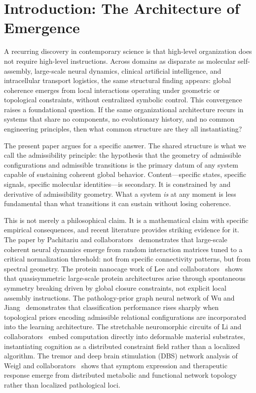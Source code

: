 \documentclass[11pt, oneside]{article}
\numberwithin{equation}{section}
\theoremstyle{rsvpstyle}
\theoremstyle{remark}
\begin{document}
\newpage

\tableofcontents

\section{Introduction: The Architecture of Emergence}

A recurring discovery in contemporary science is that high-level organization does not
require high-level instructions. Across domains as disparate as molecular self-assembly,
large-scale neural dynamics, clinical artificial intelligence, and intracellular transport
logistics, the same structural finding appears: global coherence emerges from local
interactions operating under geometric or topological constraints, without centralized
symbolic control. This convergence raises a foundational question. If the same
organizational architecture recurs in systems that share no components, no evolutionary
history, and no common engineering principles, then what common structure are they all
instantiating?

The present paper argues for a specific answer. The shared structure is what we call the
admissibility principle: the hypothesis that the geometry of admissible configurations and
admissible transitions is the primary datum of any system capable of sustaining coherent
global behavior. Content---specific states, specific signals, specific molecular
identities---is secondary. It is constrained by and derivative of admissibility geometry.
What a system \emph{is} at any moment is less fundamental than what transitions it can
sustain without losing coherence.

This is not merely a philosophical claim. It is a mathematical claim with specific
empirical consequences, and recent literature provides striking evidence for it. The
paper by Pachitariu and collaborators~\cite{Pachitariu2026Critical} demonstrates that
large-scale coherent neural dynamics emerge from random interaction matrices tuned to
a critical normalization threshold: not from specific connectivity patterns, but from
spectral geometry. The protein nanocage work of Lee and collaborators~\cite{Lee2026Nanocages}
shows that quasisymmetric large-scale protein architectures arise through spontaneous
symmetry breaking driven by global closure constraints, not explicit local assembly
instructions. The pathology-prior graph neural network of Wu and Jiang~\cite{Wu2026GNN}
demonstrates that classification performance rises sharply when topological priors encoding
admissible relational configurations are incorporated into the learning architecture.
The stretchable neuromorphic circuits of Li and collaborators~\cite{Li2026Stretchable}
embed computation directly into deformable material substrates, instantiating cognition
as a distributed constraint field rather than a localized algorithm. The tremor and
deep brain stimulation (DBS) network analysis of Weigl and collaborators~\cite{Weigl2026Tremor}
shows that symptom expression and therapeutic response emerge from distributed metabolic
and functional network topology rather than localized pathological loci.
\end{document}
